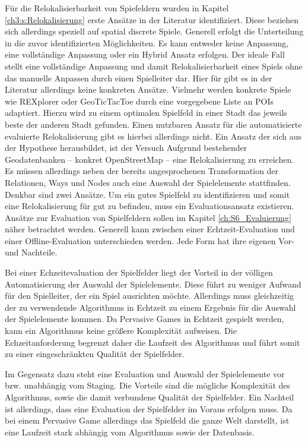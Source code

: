 Für die Relokalisierbarkeit von Spiefeldern wurden in Kapitel \ref{ch3:s:Relokalisierung} erste Ansätze in der Literatur identifiziert. Diese beziehen sich allerdings speziell auf spatial discrete Spiele.
Generell erfolgt die Unterteilung in die zuvor identifizierten Möglichkeiten.
Es kann entweder keine Anpassung, eine vollständige Anpassung oder ein Hybrid Ansatz erfolgen. Der ideale Fall stellt eine vollständige Anpassung und damit Relokalisierbarkeit eines Spiels ohne das manuelle Anpassen durch einen Spielleiter dar. Hier für gibt es in der Literatur allerdings keine konkreten Ansätze. Vielmehr werden konkrete Spiele wie REXplorer \cite{Ballagas.2007} oder GeoTicTacToe \cite{Kiefer.2007} durch eine vorgegebene Liste an POIs adaptiert. Hierzu wird zu einem optimalen Spielfeld in einer Stadt das jeweils beste der anderen Stadt gefunden.
Einen nutzbaren Ansatz für die automatisierte evaluierte Relokalisierung gibt es hierbei allerdings nicht.
Ein Ansatz der sich aus der Hypothese herausbildet, ist der Versuch Aufgrund bestehender Geodatenbanken -- konkret OpenStreetMap -- eine Relokalisierung zu erreichen. Es müssen allerdings neben der bereits angesprochenen Transformation der Relationen, Ways und Nodes auch eine Auswahl der Spielelemente stattfinden. Denkbar sind zwei Ansätze. Um ein \glqq gutes Spielfeld\grqq{} zu identifizieren und somit eine Relokalisierung für gut zu befinden, muss ein Evaluationsansatz existieren. Ansätze zur Evaluation von Spielfeldern sollen im Kapitel \ref{ch:S6_Evaluierung} näher betrachtet werden. Generell kann zwischen einer Echtzeit-Evaluation und einer Offline-Evaluation unterschieden werden. Jede Form hat ihre eigenen Vor- und Nachteile.

Bei einer Echzeitevaluation der Spielfelder liegt der Vorteil in der völligen Automatisierung der Auswahl der Spielelemente. Diese führt zu weniger Aufwand für den Spielleiter, der ein Spiel ausrichten möchte. Allerdings muss gleichzeitig der zu verwendende Algorithmus in Echtzeit zu einem Ergebnis für die Auswahl der Spielelemente kommen. Da Pervasive Games in Echtzeit gespielt werden, kann ein Algorithmus keine größere Komplexität aufweisen. Die Echzeitanforderung begrenzt daher die Laufzeit des Algorithmus und führt somit zu einer eingeschränkten Qualität der Spielfelder.

Im Gegensatz dazu steht eine Evaluation und Auswahl der Spielelemente vor bzw. unabhängig vom Staging. Die Vorteile sind die mögliche Komplexität des Algorithmus, sowie die damit verbundene Qualität der Spielfelder. Ein Nachteil ist allerdings, dass eine Evaluation der Spielfelder im Voraus erfolgen muss. Da bei einem Pervasive Game allerdings das Spielfeld die ganze Welt darstellt, ist eine Laufzeit stark abhängig vom Algorithmus sowie der Datenbasis.

